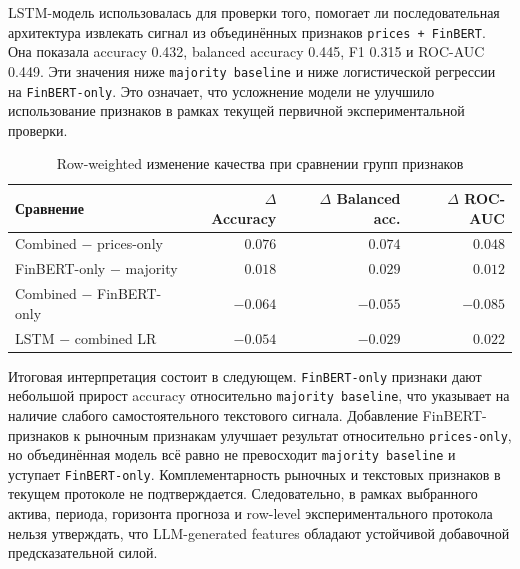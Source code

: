 LSTM-модель использовалась для проверки того, помогает ли последовательная архитектура извлекать сигнал из объединённых признаков \texttt{prices + FinBERT}. Она показала accuracy 0.432, balanced accuracy 0.445, F1 0.315 и ROC-AUC 0.449. Эти значения ниже \texttt{majority baseline} и ниже логистической регрессии на \texttt{FinBERT-only}. Это означает, что усложнение модели не улучшило использование признаков в рамках текущей первичной экспериментальной проверки.

\begin{table}[H]
\centering
\begin{tabular}{lrrr}
\toprule
Сравнение & $\Delta$ Accuracy & $\Delta$ Balanced acc. & $\Delta$ ROC-AUC \\
\midrule
Combined $-$ prices-only & $0.076$ & $0.074$ & $0.048$ \\
FinBERT-only $-$ majority & $0.018$ & $0.029$ & $0.012$ \\
Combined $-$ FinBERT-only & $-0.064$ & $-0.055$ & $-0.085$ \\
LSTM $-$ combined LR & $-0.054$ & $-0.029$ & $0.022$ \\
\bottomrule
\end{tabular}
\caption{Row-weighted изменение качества при сравнении групп признаков}
\label{tab:run03_metric_deltas}
\end{table}

Итоговая интерпретация состоит в следующем. \texttt{FinBERT-only} признаки дают небольшой прирост accuracy относительно \texttt{majority baseline}, что указывает на наличие слабого самостоятельного текстового сигнала. Добавление FinBERT-признаков к рыночным признакам улучшает результат относительно \texttt{prices-only}, но объединённая модель всё равно не превосходит \texttt{majority baseline} и уступает \texttt{FinBERT-only}. Комплементарность рыночных и текстовых признаков в текущем протоколе не подтверждается. Следовательно, в рамках выбранного актива, периода, горизонта прогноза и row-level экспериментального протокола нельзя утверждать, что LLM-generated features обладают устойчивой добавочной предсказательной силой.
